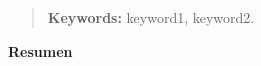 \begin{quotation}




{\bf Keywords:} keyword1, keyword2.
\end{quotation}


\newpage

\vspace*{2cm}
\thispagestyle{empty}
{\bfseries \Huge Resumen }
\vspace{1.5cm}

